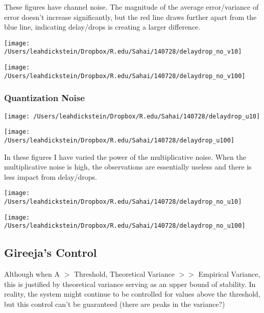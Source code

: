 \documentclass[leqno,twocolumn]{article}
\begin{document}
These figures have channel noise. The magnitude of the average error/variance of error doesn't increase significantly, but the red line draws further apart from the blue line, indicating delay/drops is creating a larger difference.

\begin{minipage}[c]{0.5\textwidth}
\texttt{[image: /Users/leahdickstein/Dropbox/R.edu/Sahai/140728/delaydrop\_no\_v10]}
\end{minipage}
\begin{minipage}[c]{0.5\textwidth}
\texttt{[image: /Users/leahdickstein/Dropbox/R.edu/Sahai/140728/delaydrop\_no\_v100]}
\end{minipage}

\subsubsection{Quantization Noise}

\begin{minipage}[c]{0.5\textwidth}
\texttt{[image: /Users/leahdickstein/Dropbox/R.edu/Sahai/140728/delaydrop\_u10]}
\end{minipage}
\begin{minipage}[c]{0.5\textwidth}
\texttt{[image: /Users/leahdickstein/Dropbox/R.edu/Sahai/140728/delaydrop\_u100]}
\end{minipage}

In these figures I have varied the power of the multiplicative noise. When the multiplicative noise is high, the observations are essentially useless and there is less impact from delay/drops.

\begin{minipage}[c]{0.5\textwidth}
\texttt{[image: /Users/leahdickstein/Dropbox/R.edu/Sahai/140728/delaydrop\_no\_u10]}
\end{minipage}
\begin{minipage}[c]{0.5\textwidth}
\texttt{[image: /Users/leahdickstein/Dropbox/R.edu/Sahai/140728/delaydrop\_no\_u100]}
\end{minipage}

\subsection{Gireeja's Control}
Although when A $>$ Threshold, Theoretical Variance $>>$ Empirical Variance, this is justified by theoretical variance serving as an upper bound of stability. In reality, the system might continue to be controlled for values above the threshold, but this control can't be guaranteed (there are peaks in the variance?)\\
\end{document}
